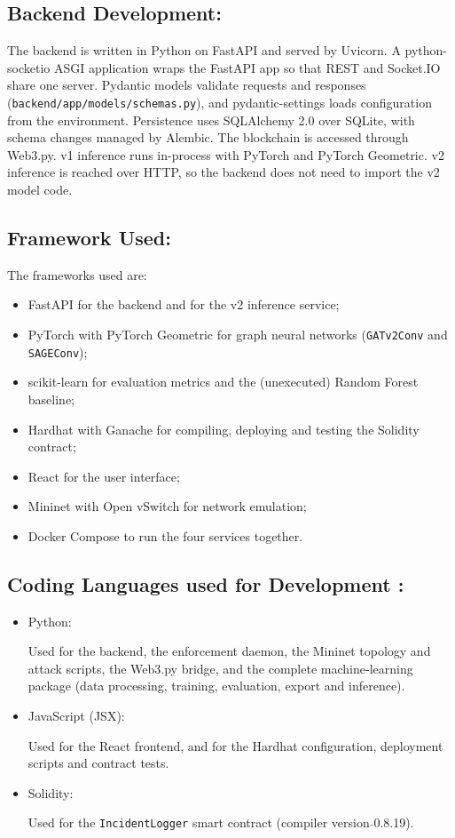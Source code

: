 \documentclass[12pt,a4paper]{report}
\begin{document}
\subsection{Backend Development:}
\label{subsec:backend}

\par The backend is written in Python on FastAPI and served by Uvicorn. A python-socketio ASGI application wraps the FastAPI app so that REST and Socket.IO share one server. Pydantic models validate requests and responses (\texttt{backend/app/models/schemas.py}), and pydantic-settings loads configuration from the environment. Persistence uses SQLAlchemy 2.0 over SQLite, with schema changes managed by Alembic. The blockchain is accessed through Web3.py. v1 inference runs in-process with PyTorch and PyTorch Geometric. v2 inference is reached over HTTP, so the backend does not need to import the v2 model code.

\subsection{Framework Used:}
\label{subsec:framework}

\par The frameworks used are:
\begin{itemize}
    \item FastAPI for the backend and for the v2 inference service;
    \item PyTorch with PyTorch Geometric for graph neural networks (\texttt{GATv2Conv} and \texttt{SAGEConv});
    \item scikit-learn for evaluation metrics and the (unexecuted) Random Forest baseline;
    \item Hardhat with Ganache for compiling, deploying and testing the Solidity contract;
    \item React for the user interface;
    \item Mininet with Open vSwitch for network emulation;
    \item Docker Compose to run the four services together.
\end{itemize}

\subsection{Coding Languages used for Development :}
\label{subsec:languages}

    \begin{itemize}
        \item {Python}:
        \par Used for the backend, the enforcement daemon, the Mininet topology and attack scripts, the Web3.py bridge, and the complete machine-learning package (data processing, training, evaluation, export and inference).
        \item {JavaScript (JSX)}:
        \par Used for the React frontend, and for the Hardhat configuration, deployment scripts and contract tests.
        \item {Solidity}:
        \par Used for the \texttt{IncidentLogger} smart contract (compiler version $\hat{}$0.8.19).
    \end{itemize}
\end{document}
